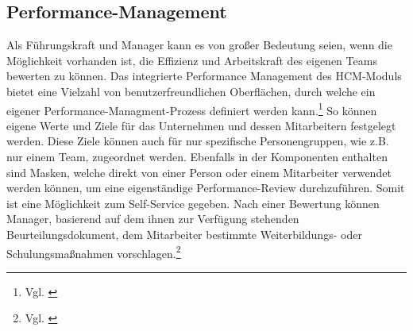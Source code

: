 \subsection{Performance-Management}
Als Führungskraft und Manager kann es von großer Bedeutung seien, wenn die Möglichkeit vorhanden ist, die Effizienz und Arbeitskraft des eigenen Teams bewerten zu können.
Das integrierte Performance Management des HCM-Moduls bietet eine Vielzahl von benutzerfreundlichen Oberflächen, durch welche ein eigener Performance-Managment-Prozess definiert werden kann.\footnote{Vgl. \cite{SAPSE2024d}}
So können eigene Werte und Ziele für das Unternehmen und dessen Mitarbeitern festgelegt werden.
Diese Ziele können auch für nur spezifische Personengruppen, wie z.B. nur einem Team, zugeordnet werden.
Ebenfalls in der Komponenten enthalten sind Masken, welche direkt von einer Person oder einem Mitarbeiter verwendet werden können, um eine eigenständige Performance-Review durchzuführen.
Somit ist eine Möglichkeit zum Self-Service gegeben. Nach einer Bewertung können Manager, basierend auf dem ihnen zur Verfügung stehenden Beurteilungsdokument, dem Mitarbeiter bestimmte Weiterbildungs- oder Schulungsmaßnahmen vorschlagen.\footnote{Vgl. \cite{SAPSE2024d}}

\newpage